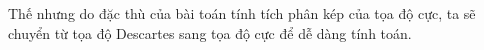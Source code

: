 \documentclass[preview]{standalone}
\begin{document}
\begin{center}
Thế nhưng do đặc thù của bài toán tính tích phân kép của tọa độ cực, ta sẽ chuyển từ tọa độ Descartes sang tọa độ cực để dễ dàng tính toán.
\end{center}
\end{document}
